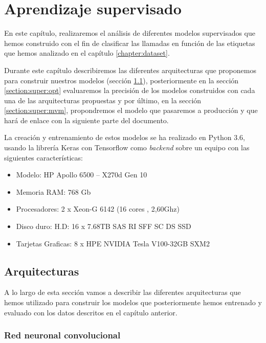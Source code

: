 \chapter{Aprendizaje supervisado}
\label{chapter:super}
En este capítulo, realizaremos el análisis de diferentes modelos supervisados que hemos construido con el fin de clasificar las llamadas en función de las etiquetas que hemos analizado en el capítulo \ref{chapter:dataset}.

Durante este capítulo describiremos las diferentes arquitecturas que proponemos para construir nuestros modelos (sección  \ref{section:super:arq}), posteriormente en la sección \ref{section:super:opt} evaluaremos la precisión de los modelos construidos con cada una de las arquitecturas propuestas y por último, en la sección \ref{section:super:mvm}, propondremos el modelo que pasaremos a producción y que hará de enlace con la siguiente parte del documento. 

La creación y entrenamiento de estos modelos se ha realizado en Python 3.6, usando la librería Keras con Tensorflow como \textit{backend} sobre un equipo con las siguientes características:

\begin{itemize}
\item Modelo: HP Apollo 6500 – X270d Gen 10

\item Memoria RAM: 768 Gb

\item Procesadores: 2 x Xeon-G 6142 (16 cores , 2,60Ghz)

\item Disco duro: H.D: 16 x 7.68TB SAS RI SFF SC DS SSD

\item Tarjetas Graficas: 8 x HPE NVIDIA Tesla V100-32GB SXM2
\end{itemize}



\section{Arquitecturas}
\label{section:super:arq}

A lo largo de esta sección vamos a describir las diferentes arquitecturas que hemos utilizado para construir los modelos que posteriormente hemos entrenado y evaluado con los datos descritos en el capítulo anterior. 

\subsection{Red neuronal convolucional}

